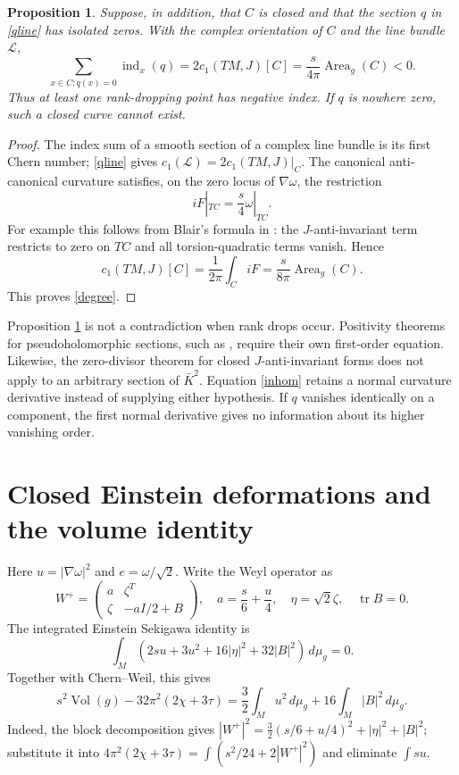 \documentclass[11pt]{article}
\newtheorem{proposition}{Proposition}
\newcommand{\tr}{\operatorname{tr}}
\newcommand{\vol}{\,d\mu_g}
\begin{document}
\begin{proposition}\label{indices}
Suppose, in addition, that $C$ is closed and that the section $q$ in \eqref{qline} has isolated zeros. With the complex orientation of $C$ and the line bundle $\mathcal L$,
\begin{equation}\label{degree}
\sum_{x\in C:q(x)=0}\operatorname{ind}_x(q)
=2c_1(TM,J)[C]
=\frac{s}{4\pi}\operatorname{Area}_g(C)<0.
\end{equation}
Thus at least one rank-dropping point has negative index. If $q$ is nowhere zero, such a closed curve cannot exist.
\end{proposition}
\begin{proof}
The index sum of a smooth section of a complex line bundle is its first Chern number; \eqref{qline} gives $c_1(\mathcal L)=2c_1(TM,J)|_C$. The canonical anti-canonical curvature satisfies, on the zero locus of $\nabla\omega$, the restriction
\[
iF|_{TC}=\frac{s}{4}\omega|_{TC}.
\]
For example this follows from Blair's formula in \cite[Proposition 2.1]{LeBrun}: the $J$-anti-invariant term restricts to zero on $TC$ and all torsion-quadratic terms vanish. Hence
\[
c_1(TM,J)[C]=\frac1{2\pi}\int_C iF
=\frac{s}{8\pi}\operatorname{Area}_g(C).
\]
This proves \eqref{degree}.
\end{proof}
Proposition \ref{indices} is not a contradiction when rank drops occur. Positivity theorems for pseudoholomorphic sections, such as \cite[Proposition 4.1]{Zhang}, require their own first-order equation. Likewise, the zero-divisor theorem for closed $J$-anti-invariant forms \cite[Theorem 1.1]{BZ} does not apply to an arbitrary section of $\bar K^2$. Equation \eqref{inhom} retains a normal curvature derivative instead of supplying either hypothesis. If $q$ vanishes identically on a component, the first normal derivative gives no information about its higher vanishing order.

\section{Closed Einstein deformations and the volume identity}
Here $u=|\nabla\omega|^2$ and $e=\omega/\sqrt2$. Write the Weyl operator as
\[
W^+=\begin{pmatrix}a&\zeta^T\\ \zeta&-a I/2+B\end{pmatrix},
\quad a=\frac{s}{6}+\frac{u}{4},\quad \eta=\sqrt2\zeta,
\quad \tr B=0.
\]
The integrated Einstein Sekigawa identity \cite[Proposition 2]{AD} is
\[
\int_M(2su+3u^2+16|\eta|^2+32|B|^2)\vol=0.
\]
Together with Chern--Weil, this gives
\begin{equation}\label{volume}
s^2\operatorname{Vol}(g)-32\pi^2(2\chi+3\tau)
=\frac32\int_Mu^2\vol+16\int_M|B|^2\vol.
\end{equation}
Indeed, the block decomposition gives
$|W^+|^2=\frac32(s/6+u/4)^2+|\eta|^2+|B|^2$;
substitute it into $4\pi^2(2\chi+3\tau)=\int(s^2/24+2|W^+|^2)$ and eliminate $\int su$.
\end{document}
